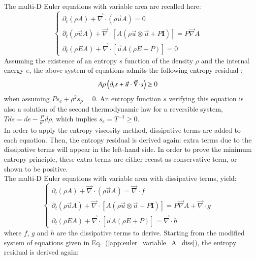 \documentclass[preprint,10pt]{elsarticle}
\renewcommand{\div}{\vec{\nabla}\! \cdot \!}
\newcommand{\grad}{\vec{\nabla}}
\newcommand{\eqt}[1]{Eq.~(\ref{#1})}                     %
\begin{document}
The multi-D Euler equations with variable area are recalled here:
%
\begin{equation}
\label{app:euler_variable_A}
\left\{ 
\begin{array}{lll}
\partial_t \left( \rho A \right) + \div \left( \rho \vec{u} A \right) = 0 \\
\partial_t \left( \rho \vec{u} A \right) + \div \left[A\left( \rho \vec{u} \otimes \vec{u} + P \mathbf{I} \right) \right] = P \grad A \\
\partial_t \left( \rho E A \right) + \div \left[ \vec{u} A \left( \rho E + P \right) \right] = 0
\end{array}
\right. \nonumber
\end{equation}
%
Assuming the existence of an entropy $s$ function of the density $\rho$ and the internal energy $e$, the above system of equations admits the following entropy residual \cite{Toro}:
%
\begin{equation}
A \rho \left( \partial_t s + \vec{u} \cdot \div s \right) \geq 0 \nonumber \\
\end{equation}
%
when assuming $Ps_e + \rho^2 s_{\rho} =0$. An entropy function $s$ verifying this equation is also a solution of the second thermodynamic law for a reversible system, $T ds = de - \frac{P}{\rho^2} d \rho$, which implies $s_e = T^{-1} \geq 0$. \\
In order to apply the entropy viscosity method, dissipative terms are added to each equation. Then, the entropy residual is derived again: extra terms due to the dissipative terms will appear in the left-hand side. In order to prove the minimum entropy principle, these extra terms are either recast as conservative term, or shown to be positive. \\ 
The multi-D Euler equations with variable area with dissipative terms, yield:
%
\begin{equation}
\label{app:euler_variable_A_diss}
\left\{ 
\begin{array}{lll}
\partial_t \left( \rho A \right) + \div \left( \rho \vec{u} A \right) = \div f \\
\partial_t \left( \rho \vec{u} A \right) + \div \left[A\left( \rho \vec{u} \otimes \vec{u} + P \mathbf{I} \right) \right] = P \grad A + \div g \\
\partial_t \left( \rho E A\right) + \div \left[ \vec{u} A \left( \rho E + P \right) \right] = \div h
\end{array}
\right. 
\end{equation}
%
where $f$, $g$ and $h$ are the dissipative terms to derive. Starting from the modified system of equations given in \eqt{app:euler_variable_A_diss}, the entropy residual is derived again:
\end{document}
